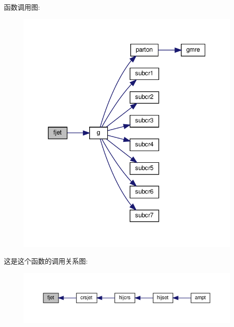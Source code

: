 函数调用图\+:
\nopagebreak
\begin{figure}[H]
\begin{center}
\leavevmode
\includegraphics[width=331pt]{fjet_8f90_a3009cc3da417da6b30f45aa860cd53dd_cgraph}
\end{center}
\end{figure}
这是这个函数的调用关系图\+:
\nopagebreak
\begin{figure}[H]
\begin{center}
\leavevmode
\includegraphics[width=350pt]{fjet_8f90_a3009cc3da417da6b30f45aa860cd53dd_icgraph}
\end{center}
\end{figure}
